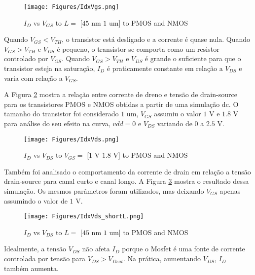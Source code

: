 \documentclass[10pt, conference,a4paper]{IEEEtran}
\begin{document}
\begin{figure}[h]
    \centering
    \texttt{[image: Figures/IdxVgs.png]}
    \caption{$I_D$ vs $V_{GS}$ to $L =$ [$45$ nm $1$ um] to PMOS and NMOS}
    \label{fig:IdxVgs}
\end{figure}

Quando $V_{GS} < V_{TH}$, o transistor está desligado e a corrente é quase nula. Quando $V_{GS} > V_{TH}$ e $V_{DS}$ é pequeno, o transistor se comporta como um resistor controlado por $V_{GS}$. Quando $V_{GS} > V_{TH}$ e $V_{DS}$ é grande o suficiente para que o transistor esteja na saturação, $I_D$ é praticamente constante em relação a $V_{DS}$ e varia com relação a $V_{GS}$.

A Figura \ref{fig:IdxVds} mostra a relação entre corrente de dreno e tensão de drain-source para os transistores PMOS e NMOS obtidas a partir de uma simulação dc. O tamanho do transistor foi considerado $1$ um, $V_{GS}$ assumiu o valor $1$ V e $1.8$ V para análise do seu efeito na curva, $vdd = 0$ e $V_{DS}$ variando de $0$ a $2.5$ V. 

\begin{figure}[h]
    \centering
    \texttt{[image: Figures/IdxVds.png]}
    \caption{$I_D$ vs $V_{DS}$ to $V_{GS} =$ [$1$ V $1.8$ V] to PMOS and NMOS}
    \label{fig:IdxVds}
\end{figure}

Também foi analisado o comportamento da corrente de drain em relação a tensão drain-source para canal curto e canal longo. A Figura \ref{fig:IdxVdsshortL} mostra o resultado dessa simulação. Os mesmos parâmetros foram utilizados, mas deixando $V_{GS}$ apenas assumindo o valor de $1$ V.

\begin{figure}[h]
    \centering
    \texttt{[image: Figures/IdxVds\_shortL.png]}
    \caption{$I_D$ vs $V_{DS}$ to $L =$ [$45$ nm $1$ um] to PMOS and NMOS}
    \label{fig:IdxVdsshortL}
\end{figure}


Idealmente, a tensão $V_{DS}$ não afeta $I_D$ porque o Mosfet é uma fonte de corrente controlada por tensão para $V_{DS} > V_{Dsat}$. Na prática, aumentando $V_{DS}$, $I_D$ também aumenta. 
\end{document}
